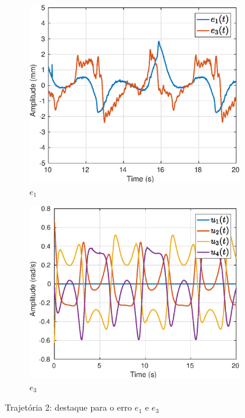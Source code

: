 \begin{figure}[H]
\centering
\begin{subfigure}{.5\textwidth}
  \centering
  \includegraphics[width=\linewidth]{./img/traj_2_k5/error.eps}
  \caption{$e_1$}
  \label{fig:sub1}
\end{subfigure}%
\begin{subfigure}{.5\textwidth}
  \centering
  \includegraphics[width=\linewidth]{./img/traj_2_k5/u.eps}
  \caption{$e_3$}
  \label{fig:sub2}
\end{subfigure}
\caption{Trajetória 2: destaque para o erro $e_1$ e $e_3$}
\label{fig:erro_traj}
\end{figure}


